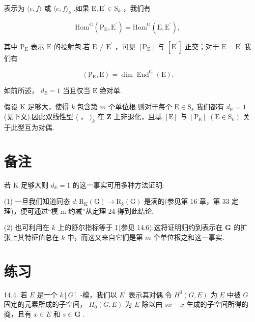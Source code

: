 \documentclass[10pt]{article}
\begin{document}
表示为 \(\langle e,f\rangle\) 或 \(\langle e,f{\rangle }_{k}\) .如果 \(\mathrm{E},{\mathrm{E}}^{\prime } \in  {\mathrm{S}}_{k}\) ，我们有

\[
{\mathrm{{Hom}}}^{\mathrm{G}}\left( {{\mathrm{P}}_{\mathrm{E}},{\mathrm{E}}^{\prime }}\right)  = {\mathrm{{Hom}}}^{\mathrm{G}}\left( {\mathrm{E},{\mathrm{E}}^{\prime }}\right) ,
\]

其中 \({\mathrm{P}}_{\mathrm{E}}\) 表示 \(\mathrm{E}\) 的投射包.若 \(\mathrm{E} \neq  {\mathrm{E}}^{\prime }\) ，可见 \(\left\lbrack  {\mathrm{P}}_{\mathrm{E}}\right\rbrack\) 与 \(\left\lbrack  {\mathrm{E}}^{\prime }\right\rbrack\) 正交；对于 \(\mathrm{E} = {\mathrm{E}}^{\prime }\) 我们有

\[
\left\langle  {{\mathrm{P}}_{\mathrm{E}},\mathrm{E}}\right\rangle   = \dim {\operatorname{End}}^{\mathrm{G}}\left( \mathrm{E}\right) .
\]

如前所述， \({d}_{\mathrm{E}} = 1\) 当且仅当 \(\mathrm{E}\) 绝对单.

假设 \(\mathrm{K}\) 足够大，使得 \(k\) 包含第 \(m\) 个单位根.则对于每个 \(\mathrm{E} \in  {\mathrm{S}}_{k}\) 我们都有 \({d}_{\mathrm{E}} = 1\) (见下文).因此双线性型 \(\langle\) ， \({\rangle }_{k}\) 在 \(\mathbf{Z}\) 上非退化，且基 \(\left\lbrack  \mathrm{E}\right\rbrack\) 与 \(\left\lbrack  {\mathrm{P}}_{\mathrm{E}}\right\rbrack \; \left( {\mathrm{E} \in  {\mathrm{S}}_{k}}\right)\) 关于此型互为对偶.

\section*{备注}

若 \(\mathrm{K}\) 足够大则 \({d}_{\mathrm{E}} = 1\) 的这一事实可用多种方法证明:

(1) 一旦我们知道同态 \(d : {\mathrm{R}}_{\mathrm{K}}\left( \mathrm{G}\right)  \rightarrow  {\mathrm{R}}_{k}\left( \mathrm{G}\right)\) 是满的(参见第 16 章，第 33 定理)，便可通过“模 m 约减”从定理 24 得到此结论.

(2) 也可利用在 \(k\) 上的舒尔指标等于 1(参见 14.6).这将证明归约到表示在 \(\mathbf{G}\) 的扩张上其特征值总在 \(k\) 中，而这又来自它们是第 \(m\) 个单位根之和这一事实.

\section*{练习}

14.4. 若 \(E\) 是一个 \(k\left\lbrack  G\right\rbrack\) -模，我们以 \({E}^{\prime }\) 表示其对偶.令 \({H}^{0}\left( {G,E}\right)\) 为 \(E\) 中被 \(G\) 固定的元素所成的子空间， \({H}_{0}\left( {G,E}\right)\) 为 \(E\) 除以由 \({sx} - x\) 生成的子空间所得的商，且有 \(x \in  E\) 和 \(s \in  \mathbf{G}\) .
\end{document}
